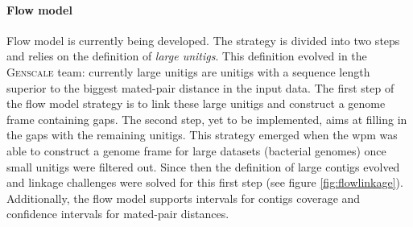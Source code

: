 \documentclass[12pt]{article}
\begin{document}
\paragraph*{Flow model} Flow model is currently being developed. The strategy is divided into two steps and relies on the definition of \textit{large unitigs}. This definition evolved in the \textsc{Genscale} team: currently large unitigs are unitigs with a sequence length superior to the biggest mated-pair distance in the input data. The first step of the flow model strategy is to link these large unitigs and construct a genome frame containing gaps. The second step, yet to be implemented, aims at filling in the gaps with the remaining unitigs. This strategy emerged when the wpm was able to construct a genome frame for large datasets (bacterial genomes) once small unitigs were filtered out. Since then the definition of large contigs evolved and linkage challenges were solved for this first step (see figure \ref{fig:flowlinkage}). Additionally, the flow model supports intervals for contigs coverage and confidence intervals for mated-pair distances.

\end{document}
